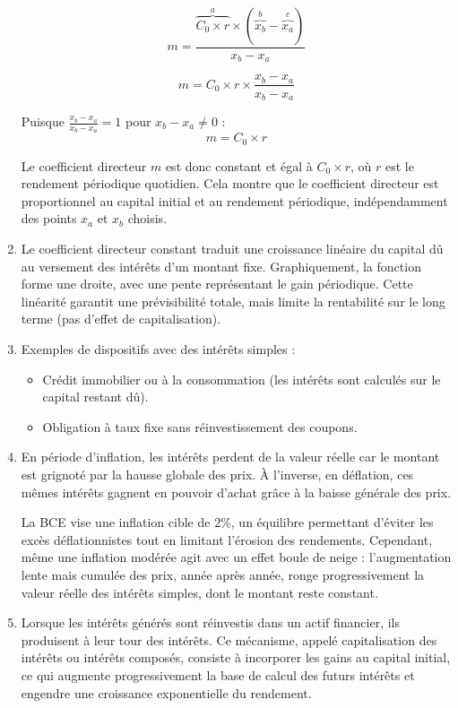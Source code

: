 \documentclass{article}
\begin{document}
\begin{enumerate}[label=\textbf{R1.\arabic*}]
	      \[
	      	m = \frac{\overset{a}{\overbrace{C_0 \times r}} \times (\overset{b}{\overbrace{x_b}} - \overset{c}{\overbrace{x_a}})}{x_b - x_a}
	      \]
	      
	      \[
	      	m = C_0 \times r \times \frac{x_b - x_a}{x_b - x_a}
	      \]
	          
	      Puisque $\frac{x_b - x_a}{x_b - x_a} = 1$ pour $x_b - x_a \neq 0$ :
	      \[
	      	\boxed{m = C_0 \times r}
	      \]
	          
	      Le coefficient directeur \( m \) est donc constant et égal à \( C_0 \times r \), où \( r \) est le rendement périodique quotidien. Cela montre que le coefficient directeur est proportionnel au capital initial et au rendement périodique, indépendamment des points \( x_a \) et \( x_b \) choisis.
	      
	\item Le coefficient directeur constant traduit une croissance linéaire du capital dû au versement des intérêts d'un montant fixe. Graphiquement, la fonction forme une droite, avec une pente représentant le gain périodique. Cette linéarité garantit une prévisibilité totale, mais limite la rentabilité sur le long terme (pas d’effet de capitalisation).
	      
	\item Exemples de dispositifs avec des intérêts simples :
	      \begin{itemize}
	      	\item Crédit immobilier ou à la consommation (les intérêts  sont calculés sur le capital restant dû).
	      	\item Obligation à taux fixe sans réinvestissement des coupons.
	      \end{itemize}
	      
	\item En période d'inflation, les intérêts perdent de la valeur réelle car le montant est grignoté par la hausse globale des prix. À l’inverse, en déflation, ces mêmes intérêts gagnent en pouvoir d’achat grâce à la baisse générale des prix. 
	      
	      La BCE vise une inflation cible de \( 2\% \), un équilibre permettant d’éviter les excès déflationnistes tout en limitant l’érosion des rendements. Cependant, même une inflation modérée agit avec un effet boule de neige : l’augmentation lente mais cumulée des prix, année après année, ronge progressivement la valeur réelle des intérêts simples, dont le montant reste constant.
	      
	\item Lorsque les intérêts générés sont réinvestis dans un actif financier, ils produisent à leur tour des intérêts. Ce mécanisme, appelé capitalisation des intérêts ou intérêts composés, consiste à incorporer les gains au capital initial, ce qui augmente progressivement la base de calcul des futurs intérêts et engendre une croissance exponentielle du rendement.
\end{enumerate}
\end{document}
